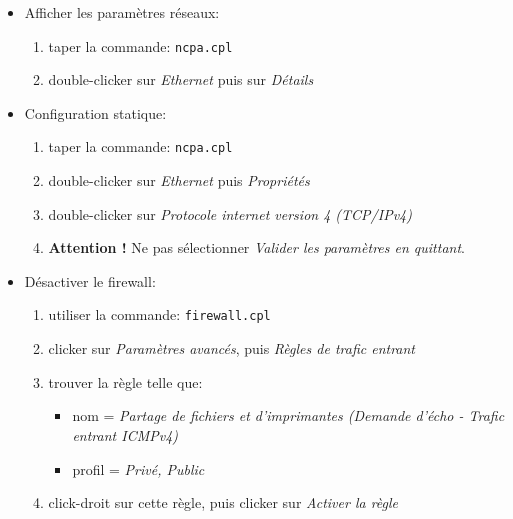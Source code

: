 \documentclass[a4paper]{article}
\renewcommand{\tt}{\texttt}
\begin{document}
\begin{itemize}





\item Afficher les paramètres réseaux:
\begin{enumerate}
    \item taper la commande: \tt{ncpa.cpl}
    \item double-clicker sur \textit{Ethernet} puis sur \textit{Détails}
\end{enumerate}





\item Configuration statique:
\begin{enumerate}
    \item taper la commande: \tt{ncpa.cpl}
    \item double-clicker sur \textit{Ethernet} puis \textit{Propriétés}
    \item double-clicker sur \textit{Protocole internet version 4 (TCP/IPv4)}
    \item \textbf{Attention !} Ne pas sélectionner \textit{Valider les paramètres en quittant}.
\end{enumerate}





\item Désactiver le firewall:
\begin{enumerate}
    \item utiliser la commande: \texttt{firewall.cpl}
    \item clicker sur \textit{Paramètres avancés}, puis \textit{Règles de trafic entrant}
    \item trouver la règle telle que:
    \begin{itemize}
        \item nom = \textit{Partage de fichiers et d’imprimantes (Demande d’écho - Trafic entrant ICMPv4)}
        \item profil = \textit{Privé, Public}
    \end{itemize}
    \item click-droit sur cette règle, puis clicker sur \textit{Activer la règle}
\end{enumerate}





\end{itemize}
\end{document}
